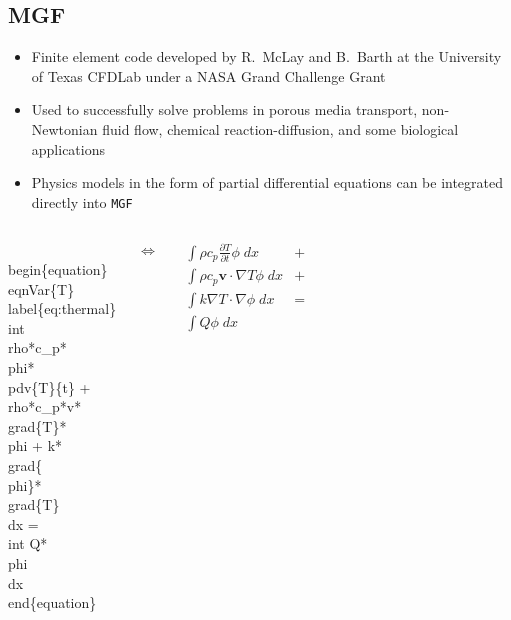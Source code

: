 \documentclass[compress,12pt]{beamer}
\newcommand{\bv}[1]{{\boldsymbol{#1}}}
\begin{document}
\subsection{MGF}
\begin{frame}[fragile]
\begin{itemize}
  \item Finite element code developed by R.~McLay and B.~Barth at the University of Texas
        CFDLab under a NASA Grand Challenge Grant
  \item Used to successfully solve problems in
        porous media transport, non-Newtonian fluid flow, chemical reaction-diffusion,
        and some biological applications
  \item Physics models in the form of partial differential equations
        can be integrated directly into \texttt{MGF}
\end{itemize}

\vspace{-.075\textheight}
\begin{columns}
  

\small
\begin{semiverbatim}
\\begin\{equation\}
  \\eqnVar\{T\}
  \\label\{eq:thermal\}
  \\int \\rho*c\_p*\\phi*\\pdv\{T\}\{t\}
  + \\rho*c\_p*v*\\grad\{T\}*\\phi 
  + k*\\grad\{\\phi\}*\\grad\{T\} \\dx
  = \\int Q*\\phi \\dx
\\end\{equation\}
\end{semiverbatim}
\normalsize


$\Leftrightarrow$


\scriptsize
\begin{align}
  \nonumber
  \int \rho c_p \frac{\partial T}{\partial t} \phi \;dx & + \mbox{}
  \\
  \nonumber
  \int \rho c_p \bv{v} \cdot \nabla T \phi \;dx & + \mbox{}
  \\
  \nonumber
  \int k \nabla T \cdot \nabla \phi \;dx &=
  \\
  \nonumber
  \int Q \phi \;dx
\end{align}
\normalsize


\end{columns}

\end{frame}
\end{document}
